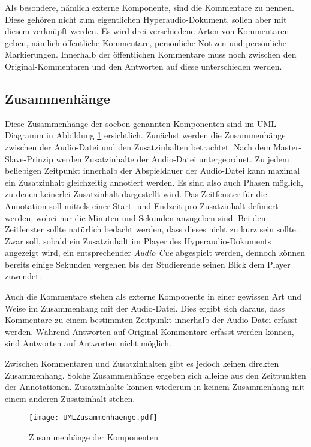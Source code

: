 Als besondere, nämlich externe Komponente, sind die Kommentare zu nennen. Diese gehören nicht zum eigentlichen Hyperaudio-Dokument, sollen aber mit diesem verknüpft werden. Es wird drei verschiedene Arten von Kommentaren geben, nämlich  öffentliche Kommentare, persönliche Notizen und persönliche Markierungen. Innerhalb der öffentlichen Kommentare muss noch zwischen den Original-Kommentaren und den Antworten auf diese unterschieden werden. 


\subsection{Zusammenhänge}
\label{sec:komponenten_zusammenhänge}
Diese Zusammenhänge der soeben genannten Komponenten sind im UML-Diagramm in Abbildung \ref{fig:UMLAufbau} ersichtlich. Zunächst werden die Zusammenhänge zwischen der Audio-Datei und den Zusatzinhalten betrachtet. Nach dem Master-Slave-Prinzip werden Zusatzinhalte der Audio-Datei untergeordnet. Zu jedem beliebigen Zeitpunkt innerhalb der Abspieldauer der Audio-Datei kann maximal ein Zusatzinhalt gleichzeitig annotiert werden. Es sind also auch Phasen möglich, zu denen keinerlei Zusatzinhalt dargestellt wird. Das Zeitfenster für die Annotation soll mittels einer Start- und Endzeit pro Zusatzinhalt definiert werden, wobei nur die Minuten und Sekunden anzugeben sind. Bei dem Zeitfenster sollte natürlich bedacht werden, dass dieses nicht zu kurz sein sollte. Zwar soll, sobald ein Zusatzinhalt im Player des Hyperaudio-Dokuments angezeigt wird, ein entsprechender \textit{Audio Cue} abgespielt werden, dennoch können bereits einige Sekunden vergehen bis der Studierende seinen Blick dem Player zuwendet.

Auch die Kommentare stehen als externe Komponente in einer gewissen Art und Weise im Zusammenhang mit der Audio-Datei. Dies ergibt sich daraus, dass Kommentare zu einem bestimmten Zeitpunkt innerhalb der Audio-Datei erfasst werden. Während Antworten auf Original-Kommentare erfasst werden können, sind Antworten auf Antworten nicht möglich.

Zwischen Kommentaren und Zusatzinhalten gibt es jedoch keinen direkten Zusammenhang. Solche Zusammenhänge ergeben sich alleine aus den Zeitpunkten der Annotationen. Zusatzinhalte können wiederum in keinem Zusammenhang mit einem anderen Zusatzinhalt stehen.


\begin{figure}[h!]
\texttt{[image: UMLZusammenhaenge.pdf]}
\caption{\label{fig:UMLAufbau}Zusammenhänge der Komponenten}
\end{figure}



